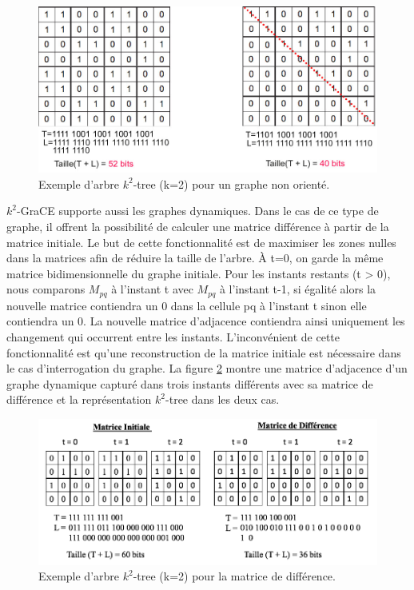 \documentclass[a4paper,oneside,12pt]{report}
\theoremstyle{definition}
\begin{document}
\begin{figure}[H]
\centering
	\includegraphics[scale=0.4]{./ressources/image/k2_non.jpg}
	\caption[Exemple d'arbre $k^2$-tree (k=2) pour un graphe non orienté.]{Exemple d'arbre $k^2$-tree (k=2) pour un graphe non orienté.}
	\label{k2_non}
\end{figure}	


	
	$k^2$-GraCE supporte aussi les graphes dynamiques. Dans le cas de ce type de graphe, il offrent la possibilité de calculer une matrice différence à partir de la matrice initiale. Le but de cette fonctionnalité est de maximiser les zones nulles dans la matrices afin de réduire la taille de l'arbre. À t=0, on garde la même matrice bidimensionnelle du graphe initiale. Pour les instants restants (t > 0), nous comparons $M_{pq}$ à l'instant t avec $M_{pq}$ à l'instant t-1, si égalité alors la nouvelle matrice contiendra un 0 dans la cellule pq à l'instant t sinon elle contiendra un 0. La nouvelle matrice d'adjacence contiendra ainsi uniquement les changement qui occurrent entre les instants. L'inconvénient de cette fonctionnalité est qu'une reconstruction de la matrice initiale est nécessaire dans le cas d'interrogation du graphe. La figure \ref{mat_diff} montre une matrice d'adjacence d'un graphe dynamique capturé dans trois instants différents avec sa matrice de différence et la représentation $k^2$-tree dans les deux cas.

\begin{figure}[H]
\centering
	\includegraphics[scale=0.48]{./ressources/image/dynk2diff.png}
	\caption[Exemple d'arbre $k^2$-tree (k=2) pour la matrice de différence]{Exemple d'arbre $k^2$-tree (k=2) pour la matrice de différence.}
	\label{mat_diff}
\end{figure}
\end{document}
